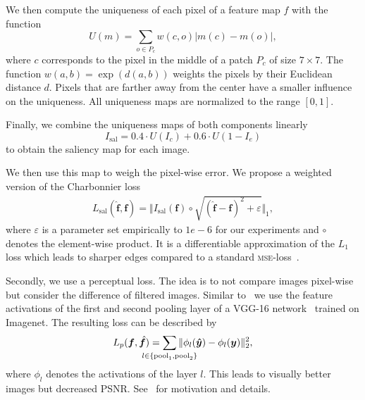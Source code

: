 \documentclass{scrartcl}
\newcommand{\img}{\bm{f}} %
\begin{document}
We then compute the uniqueness of each pixel of a feature map \(f\) with the function
\begin{equation}
  \label{eq:uniq}
  U(m) = \sum_{o \in P_c} w(c, o) \vert m(c) - m(o) \vert,
\end{equation}
where \(c\) corresponds to the pixel in the middle of a patch \(P_c\) of size \(7 \times 7\).
The function \(w(a,b) = \exp(d(a, b))\) weights the pixels by their Euclidean distance \(d\).
Pixels that are farther away from the center have a smaller influence on the uniqueness.
All uniqueness maps are normalized to the range \([0,1]\).

Finally, we combine the uniqueness maps of both components linearly
\begin{equation}
  \label{eq:saliency}
  I_{\text{sal}} = 0.4 \cdot U(I_c) + 0.6 \cdot U(1 - I_e)
\end{equation}
to obtain the saliency map for each image.

We then use this map to weigh the pixel-wise error.
We propose a weighted version of the Charbonnier loss
\begin{align}
\label{eq:charbonnier}
  L_{\text{sal}}( \hat{\bm{\img}}, \bm{\img}) = \Vert I_{\text{sal}}(\img) \circ \sqrt{ (\hat{\img} - \img)^2 + \varepsilon} \Vert_1,
\end{align}
where $\varepsilon$ is a parameter set empirically to $1e-6$ for our experiments and \(\circ\) denotes the element-wise product.
It is a differentiable approximation of the $L_1$ loss which leads to sharper edges compared to a standard \textsc{mse}-loss~\cite{LapSRN}.

Secondly, we use a perceptual loss.
The idea is to not compare images pixel-wise but consider the difference of filtered images.
Similar to~\cite{PerceptualLoss} we use the feature activations of the first and second pooling layer of a VGG-16 network~\cite{Vgg} trained on Imagenet.
The resulting loss can be described by
\begin{equation}
  \label{eq:perceptual-loss}
  L_p(\img, \hat{\img}) = \sum_{\mathclap{l \in \{ \text{pool}_1, \text{pool}_2 \}}} \Vert \phi_l( \bm{\hat{y}} ) - \phi_l (\bm{y}) \Vert_2^2,
\end{equation}
where \(\phi_l\) denotes the activations of the layer \(l\).
This leads to visually better images but decreased PSNR.
See~\cite{PerceptualLoss} for motivation and details.
\end{document}
